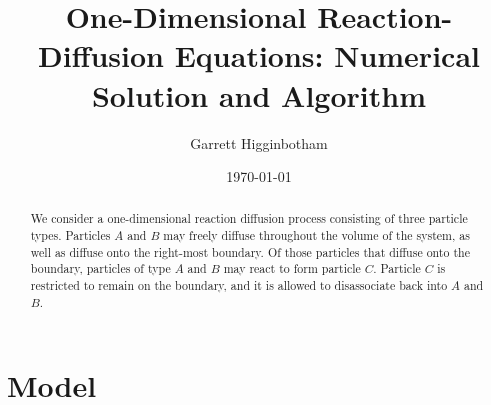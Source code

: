 \documentclass[aps, prl, preprint]{revtex4-1}
\begin{document}
\title{One-Dimensional Reaction-Diffusion Equations: Numerical Solution and Algorithm}
\author{Garrett Higginbotham}
\date{\today}

\begin{abstract}
We consider a one-dimensional reaction diffusion process consisting of three particle types. Particles $A$ and $B$ may freely diffuse throughout the volume of the system, as well as diffuse onto the right-most boundary. Of those particles that diffuse onto the boundary, particles of type $A$ and $B$ may react to form particle $C$. Particle $C$ is restricted to remain on the boundary, and it is allowed to disassociate back into $A$ and $B$.
\end{abstract}

\maketitle

\section{Model}
\end{document}
